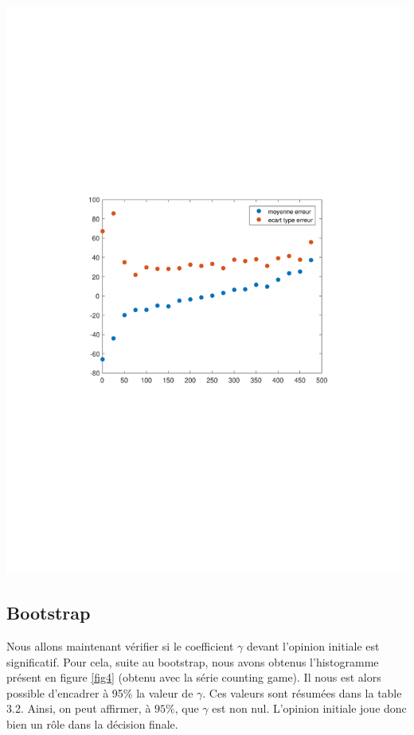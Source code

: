 \documentclass{scrreprt}
\begin{document}
\begin{center}
\includegraphics[trim = 3cm 9cm 3cm 9cm, clip]{residuMoyen.pdf}
\label{fig3}
\end{center}

\begin{multicols}{2}

\section{Bootstrap}

Nous allons maintenant vérifier si le coefficient $\gamma$ devant l'opinion initiale est significatif. Pour cela, suite au bootstrap, nous avons obtenus l'histogramme présent en figure \ref{fig4} (obtenu avec la série counting game). Il nous est alors possible d'encadrer à 95\% la valeur de $\gamma$. Ces valeurs sont résumées dans la table 3.2. Ainsi, on peut affirmer, à $95\%$, que $\gamma$ est non nul. L'opinion initiale joue donc bien un rôle dans la décision finale.

\end{multicols}
\end{document}
